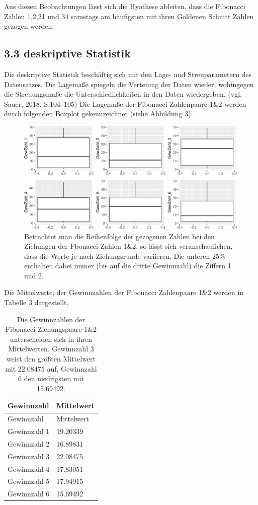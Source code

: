 \documentclass[ngerman,]{article}
\begin{document}
Aus diesen Beobachtungen lässt sich die Hyothese ableiten, dass die
Fibonacci Zahlen 1,2,21 und 34 samstags am häufigsten mit ihren Goldenen
Schnitt Zahlen gezogen werden.

\subsection{3.3 deskriptive Statistik}\label{deskriptive-statistik}

Die deskriptive Statistik beschäftig sich mit den Lage- und
Streuparametern des Datensatzes. Die Lagemaße spiegeln die Verteiung der
Daten wieder, wohingegen die Streuungsmaße die Unterschiedlichkeiten in
den Daten wiedergeben. (vgl. Sauer, 2018, S.104--105) Die Lagemaße der
Fibonacci Zahlenpaare 1\&2 werden durch folgenden Boxplot gekennzeichnet
(siehe Abbildung 3).

\begin{figure}

\includegraphics{Abbildung/a-1} \hfill{}

\caption{Betrachtet man die Reihenfolge der gezogenen Zahlen bei den Ziehungen der Fbonacci Zahlen 1\&2, so lässt sich veranschaulichen, dass die Werte je nach Ziehungsrunde variieren. Die unteren 25\% enthalten dabei immer (bis auf die dritte Gewinnzahl) die Ziffern 1 und 2.}\label{fig:a}
\end{figure}

Die Mittelwerte, der Gewinnzahlen der Fibonacci Zahlenpaare 1\&2 werden
in Tabelle 3 dargestellt.

\begin{longtable}[]{@{}ll@{}}
\caption{Die Gewinnzahlen der Fibonacci-Ziehungspaare 1\&2 unterscheiden
sich in ihren Mittelwerten. Gewinnzahl 3 weist den größten Mittelwert
mit 22.08475 auf, Gewinnzahl 6 den niedrigsten mit
15.69492.}\tabularnewline
\toprule
Gewinnzahl & Mittelwert\tabularnewline
\midrule
\endfirsthead
\toprule
Gewinnzahl & Mittelwert\tabularnewline
\midrule
\endhead
Gewinnzahl 1 & 19.20339\tabularnewline
Gewinnzahl 2 & 16.89831\tabularnewline
Gewinnzahl 3 & 22.08475\tabularnewline
Gewinnzahl 4 & 17.83051\tabularnewline
Gewinnzahl 5 & 17.94915\tabularnewline
Gewinnzahl 6 & 15.69492\tabularnewline
\bottomrule
\end{longtable}
\end{document}
